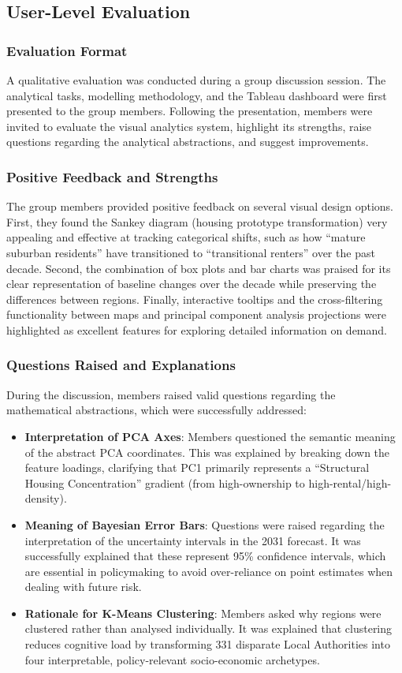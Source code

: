 \documentclass[conference]{IEEEtran}
\begin{document}
\subsection{User-Level Evaluation}

\subsubsection{Evaluation Format}
A qualitative evaluation was conducted during a group discussion session. The analytical tasks, modelling methodology, and the Tableau dashboard were first presented to the group members. Following the presentation, members were invited to evaluate the visual analytics system, highlight its strengths, raise questions regarding the analytical abstractions, and suggest improvements.

\subsubsection{Positive Feedback and Strengths}
The group members provided positive feedback on several visual design options. First, they found the Sankey diagram (housing prototype transformation) very appealing and effective at tracking categorical shifts, such as how “mature suburban residents” have transitioned to “transitional renters” over the past decade. Second, the combination of box plots and bar charts was praised for its clear representation of baseline changes over the decade while preserving the differences between regions. Finally, interactive tooltips and the cross-filtering functionality between maps and principal component analysis projections were highlighted as excellent features for exploring detailed information on demand.

\subsubsection{Questions Raised and Explanations}
During the discussion, members raised valid questions regarding the mathematical abstractions, which were successfully addressed:
\begin{itemize}
    \item \textbf{Interpretation of PCA Axes}: Members questioned the semantic meaning of the abstract PCA coordinates. This was explained by breaking down the feature loadings, clarifying that PC1 primarily represents a ``Structural Housing Concentration'' gradient (from high-ownership to high-rental/high-density).
    \item \textbf{Meaning of Bayesian Error Bars}: Questions were raised regarding the interpretation of the uncertainty intervals in the 2031 forecast. It was successfully explained that these represent 95\% confidence intervals, which are essential in policymaking to avoid over-reliance on point estimates when dealing with future risk.
    \item \textbf{Rationale for K-Means Clustering}: Members asked why regions were clustered rather than analysed individually. It was explained that clustering reduces cognitive load by transforming 331 disparate Local Authorities into four interpretable, policy-relevant socio-economic archetypes.
\end{itemize}
\end{document}
